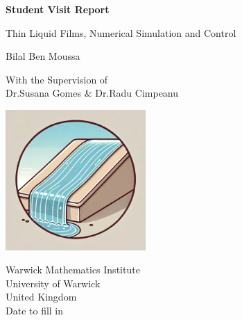 \documentclass[12pt]{article}
\begin{document}
\begin{titlepage}
    \begin{center}
        \vspace*{1cm}
            
        \Huge
        \textbf{Student Visit Report}
            
        \vspace{0.5cm}
        \LARGE
        Thin Liquid Films, Numerical Simulation and Control
            
        \vspace{1.5cm}
            
        Bilal Ben Moussa
            
        \vfill
            
        With the Supervision of \\
        Dr.Susana Gomes \& Dr.Radu Cimpeanu
            
        \vspace{0.8cm}
            
        \includegraphics[width=0.4\textwidth]{cartoon_thin_film.png}
            
        \Large
        Warwick Mathematics Institute\\
        University of Warwick\\
        United Kingdom\\
        Date to fill in
    \end{center}
\end{titlepage}

\newpage
\end{document}
